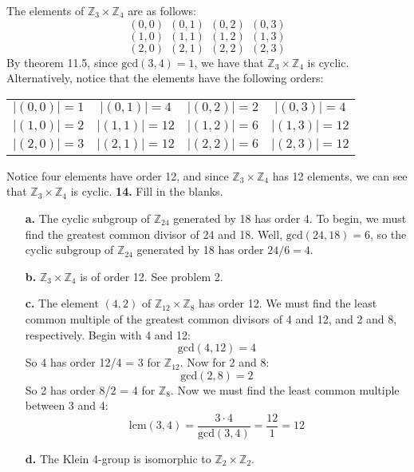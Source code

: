 \documentclass{article}
\begin{document}
The elements of $\mathbb{Z}_3 \times \mathbb{Z}_4$ are as follows:
\[(0,0) \:\: (0,1) \:\: (0,2) \:\: (0,3)\]
\[(1,0) \:\: (1,1) \:\: (1,2) \:\: (1,3)\]
\[(2,0) \:\: (2,1) \:\: (2,2) \:\: (2,3)\]
By theorem 11.5, since $\text{gcd}(3,4) = 1$, we have that $\mathbb{Z}_3 \times \mathbb{Z}_4$ is cyclic. Alternatively, notice that the elements have the following orders:
\begin{center}
    \begin{tabular}{c|c|c|c}
        $|(0,0)| = 1$ &$|(0,1)| = 4$ & $|(0,2)| = 2$ & $|(0,3)| = 4$ \\
        $|(1,0)| = 2$ & $|(1,1)| = 12$ & $|(1,2)| = 6$ & $|(1,3)| = 12$ \\
        $|(2,0)| = 3$ & $|(2,1)| = 12$ & $|(2,2)| = 6$ & $|(2,3)| = 12$ \\
    \end{tabular}
\end{center}
Notice four elements have order 12, and since $\mathbb{Z}_3 \times \mathbb{Z}_4$ has 12 elements, we can see that $\mathbb{Z}_3 \times \mathbb{Z}_4$ is cyclic. 
\newline\newline
\textbf{14.} Fill in the blanks.
\begin{enumerate}
    \item[\textbf{a.}] The cyclic subgroup of $\mathbb{Z}_{24}$ generated by 18 has order 4.
    \newline
    To begin, we must find the greatest common divisor of 24 and 18. Well, $\text{gcd}(24,18) = 6$, so the cyclic subgroup of $\mathbb{Z}_{24}$ generated by 18 has order $24/6 = 4$.
    \newline
    \item[\textbf{b.}] $\mathbb{Z}_3 \times \mathbb{Z}_4$ is of order 12.
    See problem 2. 
    \item[\textbf{c.}] The element $(4,2)$ of $\mathbb{Z}_{12} \times \mathbb{Z}_8$ has order 12.
    \newline
    We must find the least common multiple of the greatest common divisors of 4 and 12, and 2 and 8, respectively. Begin with 4 and 12:
    \[\text{gcd}(4,12) = 4\]
    So 4 has order 12/4 = 3 for $\mathbb{Z}_{12}$. Now for 2 and 8:
    \[\text{gcd}(2,8) = 2\]
    So 2 has order 8/2 = 4 for $\mathbb{Z}_8$. Now we must find the least common multiple between 3 and 4:
    \[\text{lcm}(3,4) = \frac{3\cdot 4}{\text{gcd}(3,4)} = \frac{12}{1} = 12\]
    \item[\textbf{d.}] The Klein 4-group is isomorphic to $\mathbb{Z}_2 \times \mathbb{Z}_2$.
\end{enumerate}
\end{document}
